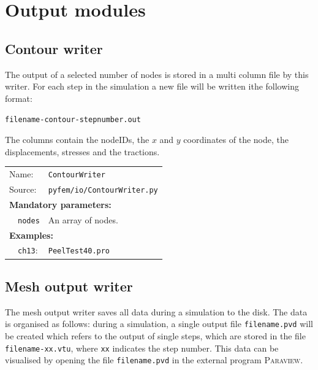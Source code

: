 \documentclass{article}
\begin{document}
\section{Output modules}\label{sec:output}

\subsection{Contour writer}

The output of a selected number of nodes is stored in a multi column file by this writer. For each step in the simulation a
new file will be written ithe following format:

\noindent
\texttt{filename-contour-stepnumber.out}

The columns contain the nodeIDs, the $x$ and $y$ coordinates of the node, the displacements, stresses and the tractions.

\vspace{2mm}
\begin{tabular}{p{22mm}p{74mm}}
Name:         & \texttt{ContourWriter} \\
Source:  & \texttt{pyfem/io/ContourWriter.py} \\
\multicolumn{2}{l}{\textbf{Mandatory parameters:}} \\
~~\texttt{nodes}    & An array of nodes.\\
\multicolumn{2}{l}{\textbf{Examples:}}\\
~~\texttt{ch13}: & \texttt{PeelTest40.pro}
\end{tabular}

\subsection{Mesh output writer}\label{par:vtk}

The mesh output writer saves all data during a simulation to the disk.
The data is organised as follows: during a simulation, a single output file \texttt{filename.pvd} will be created which refers to the output
of single steps, which are stored in the file \texttt{filename-xx.vtu}, where \texttt{xx} indicates the step number.
This data can be visualised by opening the file \texttt{filename.pvd} in the external program \textsc{Paraview}.
\end{document}
